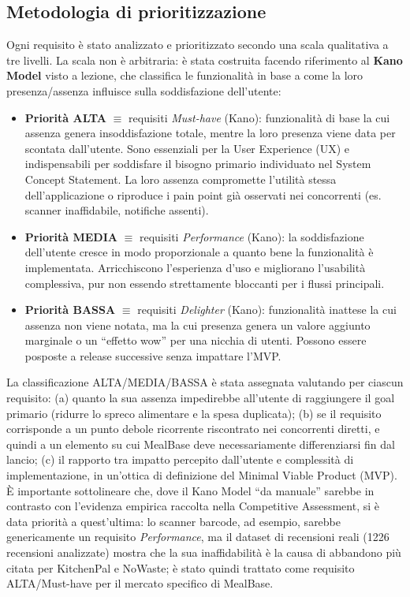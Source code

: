 \documentclass[11pt,a4paper]{article}
\begin{document}
\subsection{Metodologia di prioritizzazione}
Ogni requisito è stato analizzato e prioritizzato secondo una scala qualitativa a tre livelli. La scala non è arbitraria: è stata costruita facendo riferimento al \textbf{Kano Model} visto a lezione, che classifica le funzionalità in base a come la loro presenza/assenza influisce sulla soddisfazione dell'utente:
\begin{itemize}
    \item \textbf{Priorità ALTA} $\equiv$ requisiti \textit{Must-have} (Kano): funzionalità di base la cui assenza genera insoddisfazione totale, mentre la loro presenza viene data per scontata dall'utente. Sono essenziali per la User Experience (UX) e indispensabili per soddisfare il bisogno primario individuato nel System Concept Statement. La loro assenza compromette l'utilità stessa dell'applicazione o riproduce i pain point già osservati nei concorrenti (es. scanner inaffidabile, notifiche assenti).
    \item \textbf{Priorità MEDIA} $\equiv$ requisiti \textit{Performance} (Kano): la soddisfazione dell'utente cresce in modo proporzionale a quanto bene la funzionalità è implementata. Arricchiscono l'esperienza d'uso e migliorano l'usabilità complessiva, pur non essendo strettamente bloccanti per i flussi principali.
    \item \textbf{Priorità BASSA} $\equiv$ requisiti \textit{Delighter} (Kano): funzionalità inattese la cui assenza non viene notata, ma la cui presenza genera un valore aggiunto marginale o un ``effetto wow'' per una nicchia di utenti. Possono essere posposte a release successive senza impattare l'MVP.
\end{itemize}
La classificazione ALTA/MEDIA/BASSA è stata assegnata valutando per ciascun requisito: (a) quanto la sua assenza impedirebbe all'utente di raggiungere il goal primario (ridurre lo spreco alimentare e la spesa duplicata); (b) se il requisito corrisponde a un punto debole ricorrente riscontrato nei concorrenti diretti, e quindi a un elemento su cui MealBase deve necessariamente differenziarsi fin dal lancio; (c) il rapporto tra impatto percepito dall'utente e complessità di implementazione, in un'ottica di definizione del Minimal Viable Product (MVP).
\newline
È importante sottolineare che, dove il Kano Model ``da manuale'' sarebbe in contrasto con l'evidenza empirica raccolta nella Competitive Assessment, si è data priorità a quest'ultima: lo scanner barcode, ad esempio, sarebbe genericamente un requisito \textit{Performance}, ma il dataset di recensioni reali (1226 recensioni analizzate) mostra che la sua inaffidabilità è la causa di abbandono più citata per KitchenPal e NoWaste; è stato quindi trattato come requisito ALTA/Must-have per il mercato specifico di MealBase.
\end{document}
